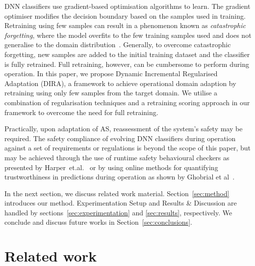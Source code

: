 DNN classifiers use gradient-based optimisation algorithms to learn. 
%
The gradient optimiser modifies the decision boundary based on the samples used in training. 
%
Retraining using few samples can result in a phenomenon known as \textit{catastrophic forgetting}, where the model overfits to the few training samples used and does not generalise to the domain distribution~\cite{Goodfellow2014}. 
%
Generally, to overcome catastrophic forgetting, new samples are added to the initial training dataset and the classifier is fully retrained. 
%
Full retraining, however, can be cumbersome to perform during operation. 
% 
%
In this paper, we propose Dynamic Incremental Regularised Adaptation (DIRA), a framework to achieve operational domain adaption by retraining using only few samples from the target domain. 
%
We utilise a combination of regularisation techniques and a retraining scoring approach in our framework to overcome the need for full retraining.

Practically, upon adaptation of AS, reassessment of the system's safety may be required.  
%
The safety compliance of evolving DNN classifiers during operation against a set of requirements or regulations is beyond the scope of this paper, but may be achieved through the use of runtime safety behavioural checkers as presented by Harper~et.al.~\cite{harper2021safety} or by using online methods for quantifying trustworthiness in predictions during operation as shown by Ghobrial et al~\cite{ghobrial2023trustworthiness}. 

In the next section, we discuss related work material. Section~\ref{sec:method} introduces our method.
%
Experimentation Setup and Results \& Discussion are handled by sections~\ref{sec:experimentation} and \ref{sec:results}, respectively.
%
We conclude and discuss future works in Section~\ref{sec:conclusions}.



\section{Related work}
